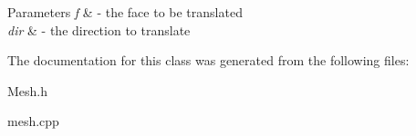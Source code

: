 \begin{DoxyParams}{Parameters}
{\em f} & -\/ the face to be translated\\
\hline
{\em dir} & -\/ the direction to translate \\
\hline
\end{DoxyParams}


The documentation for this class was generated from the following files\-:\begin{DoxyCompactItemize}
\item 
Mesh.\-h\item 
mesh.\-cpp\end{DoxyCompactItemize}
